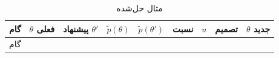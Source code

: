 \begin{landscape}\small
\begin{longtable}[]{@{}
  >{\raggedright\arraybackslash}p{}
  >{\raggedright\arraybackslash}p{}
  >{\raggedright\arraybackslash}p{}
  >{\raggedright\arraybackslash}p{}
  >{\raggedright\arraybackslash}p{}
  >{\raggedright\arraybackslash}p{}
  >{\raggedright\arraybackslash}p{}
  >{\raggedright\arraybackslash}p{}
  >{\raggedright\arraybackslash}p{}@{}}
\caption{\centering مثال حل‌شده}\tabularnewline
\toprule\noalign{}
\begin{minipage}[b]{\linewidth}\raggedright
گام
\end{minipage} & \begin{minipage}[b]{\linewidth}\raggedright
\(\theta\) فعلی
\end{minipage} & \begin{minipage}[b]{\linewidth}\raggedright
پیشنهاد \(\theta'\)
\end{minipage} & \begin{minipage}[b]{\linewidth}\raggedright
\(\tilde p(\theta)\)
\end{minipage} & \begin{minipage}[b]{\linewidth}\raggedright
\(\tilde p(\theta')\)
\end{minipage} & \begin{minipage}[b]{\linewidth}\raggedright
نسبت
\end{minipage} & \begin{minipage}[b]{\linewidth}\raggedright
\(u\)
\end{minipage} & \begin{minipage}[b]{\linewidth}\raggedright
تصمیم
\end{minipage} & \begin{minipage}[b]{\linewidth}\raggedright
\(\theta\) جدید
\end{minipage} \\
\midrule\noalign{}
\endfirsthead
\toprule\noalign{}
\begin{minipage}[b]{\linewidth}\raggedright
گام
\end{minipage} & \begin{minipage}[b]{\linewidth}\raggedright

\end{minipage}
\end{longtable}
\end{landscape}

